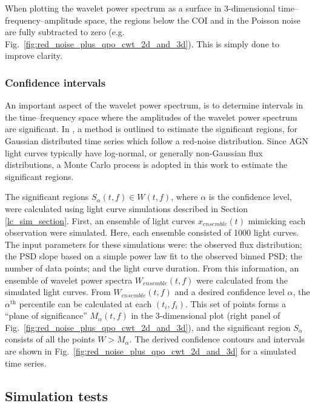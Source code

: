 \documentclass[fleqn,usenatbib]{mnras}
\begin{document}
When plotting the wavelet power spectrum as a surface in 3-dimensional time--frequency--amplitude space, the regions below the COI and in the Poisson noise are fully subtracted to zero (e.g. Fig.~\ref{fig:red_noise_plus_qpo_cwt_2d_and_3d}). This is simply done to improve clarity.





\subsubsection{Confidence intervals} \label{significance_section}

An important aspect of the wavelet power spectrum, is to determine intervals in the  time--frequency space where the amplitudes of the wavelet power spectrum are significant. In \citet{torrence1998}, a method is outlined to estimate the significant regions, for Gaussian distributed time series which follow a red-noise distribution. Since AGN light curves typically have log-normal, or generally non-Gaussian flux distributions, a Monte Carlo process is adopted in this work to estimate the significant regions.


The significant regions $S_{\alpha}(t,f) \in W(t,f)$, where $\alpha$ is the confidence level, were calculated using light curve simulations described in Section \ref{lc_sim_section}.  First, an ensemble of light curves $x_{ensemble}(t)$ mimicking each observation were simulated. Here, each ensemble consisted of 1000 light curves. The input parameters for these simulations were: the observed flux distribution; the PSD slope based on a simple power law fit to the observed binned PSD; the number of data points; and the light curve duration.  From this information, an ensemble of wavelet power spectra $W_{ensemble}(t,f)$ were calculated from the simulated light curves. From $W_{ensemble}(t,f)$ and a desired confidence level $\alpha$, the $\alpha^{\text{th}}$ percentile can be calculated at each $(t_i,f_i)$. This set of points forms a ``plane of significance'' $M_{\alpha}(t,f)$ in the 3-dimensional plot (right panel of Fig.~\ref{fig:red_noise_plus_qpo_cwt_2d_and_3d}), and the significant region $S_{\alpha}$ consists of all the points $W > M_{\alpha}$.  The derived confidence contours and intervals are shown in Fig.~\ref{fig:red_noise_plus_qpo_cwt_2d_and_3d} for a simulated time series.

\subsection{Simulation tests} \label{sim_section}
\end{document}

